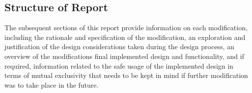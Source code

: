 \subsection{Structure of Report}
The subsequent sections of this report provide information on each modification, including the rationale and specification of the modification, an exploration and justification of the design considerations taken during the design process, an overview of the modifications final implemented design and functionality, and if required, information related to the safe usage of the implemented design in terms of mutual exclusivity that needs to be kept in mind if further modification was to take place in the future.